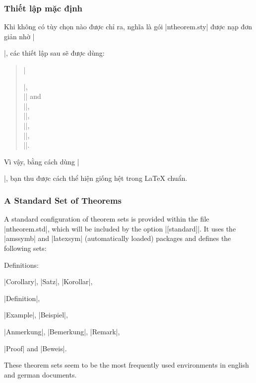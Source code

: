 \documentclass[11pt,oneside]{ltxdoc}
\theoremstyle{marginbreak}
\theoremstyle{changebreak}
\theoremstyle{change}
\theoremstyle{plain}
\theoremstyle{nonumberplain}
\begin{document}
\subsubsection{Thiết lập mặc định}

Khi không có tùy chọn nào được chỉ ra, nghĩa là gói |ntheorem.sty|
được nạp đơn giản nhờ |\usepackage{ntheorem}|, các thiết lập sau
sẽ được dùng:
\begin{quote} 
|\theoremstyle{plain}|,\\
|\theoremheaderfont{\normalfont\bfseries}| and\\
|\theorembodyfont{\itshape}|,\\
|\theoremseparator{}|,\\
||,\\
||, \\
|\theoremsymbol{}|.
\end{quote}
Vì vậy, bằng cách dùng |\newtheorem{...}{...}|, bạn thu được
cách thể hiện giống hệt trong \LaTeX{} chuẩn.

\subsubsection{A Standard Set of Theorems}\label{sec:standard}

A standard configuration of theorem sets is provided within
the file |ntheorem.std|, which will be included by the option
|[standard]|. It uses the |amssymb| and |latexsym| (automatically
loaded) packages and defines the following sets:
\begin{nlist}{Definitions:}
 \item[Theorems:] %
  |Corollary|, |Satz|, |Korollar|,
 \item[Definitions:] |Definition|,
 \item[Examples:] |Example|, |Beispiel|,
 \item[Remarks:] |Anmerkung|, |Bemerkung|, |Remark|,
 \item[Proofs:] |Proof| and |Beweis|.
\end{nlist}
These theorem sets seem to be the most frequently used environments 
in english and german
documents.
\end{document}
